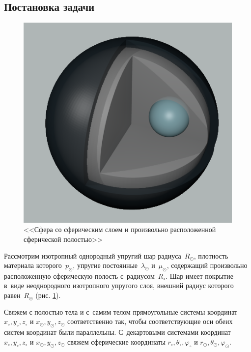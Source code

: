 \subsection{Постановка задачи}
\begin{figure}[h]
\begin{center}
\begin{minipage}[h]{0.47\linewidth}
\includegraphics[width=1\linewidth]{sphere_edited.png}
\caption{<<Сфера со сферическим слоем и произвольно расположенной сферической полостью>>}\label{pic_1}
\end{minipage}
\end{center}
\end{figure}

Рассмотрим изотропный однородный упругий шар радиуса~$R_\odot$, плотность материала которого~$p_\odot$, упругие постоянные~$\lambda_\odot$ и~$\mu_\odot$, содержащий произвольно расположенную сферическую полость с~радиусом~$R_\circ$. Шар имеет покрытие в~виде неоднородного изотропного упругого слоя, внешний радиус которого равен~$R_\circledcirc$ (рис. \cref{pic_1}).
 
Свяжем с полостью тела и с~самим телом прямоугольные системы координат $x_\circ, y_\circ, z_\circ$ и $x_\odot, y_\odot, z_\odot$ соответственно так, чтобы соответствующие оси обеих систем координат были параллельны. С~декартовыми системами координат $x_\circ, y_\circ, z_\circ$ и $x_\odot, y_\odot, z_\odot$ свяжем сферические координаты $r_\circ, \theta_\circ, \varphi_\circ$ и $r_\odot, \theta_\odot, \varphi_\odot$.

